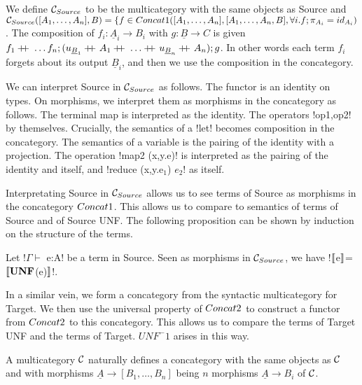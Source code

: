 \begin{definition}
    We define $\mathcal{C}_{Source}$ to be the multicategory with the same objects as Source and 
    $\mathcal{C}_{Source}([A_1,\ldots,A_n],B)=\{f\in Concat1([A_1,\ldots,A_n],[A_1,\ldots,A_n,B], \forall i.f;\pi_{A_i}=id_{A_i})$.
    The composition of $f_i:\underline{A}_i\to B_i$ with $g:\underline{B}\to C$ is given 
    $f_1\concatcomp\ldots f_n;(u_{\underline{B}_1}\concatcomp A_1 \concatcomp \ldots \concatcomp u_{\underline{B}_n}\concatcomp A_n);g$.
    In other words each term $f_i$ forgets about its output $\underline{B}_i$, and then we use the composition in the concategory.
\end{definition}

We can interpret Source in $\mathcal{C}_{Source}$ as follows. The functor is an identity on types. 
On morphisms, we interpret them as morphisms in the concategory as follows.
The terminal map is interpreted as the identity. The operators !op1,op2! by themselves.
Crucially, the semantics of a !let! becomes composition in the concategory. 
The semantics of a variable is the pairing of the identity with a projection.
The operation !map2 (x,y.e)! is interpreted as the pairing of the identity and itself, and !reduce (x,y.e$_1$) $e_2$! as itself.

Interpretating Source in $\mathcal{C}_{Source}$ allows us to see terms of Source as morphisms in the concategory $Concat1$.
This allows us to compare to semantics of terms of Source and of Source UNF.
The following proposition can be shown by induction on the structure of the terms.

\begin{proposition}
    Let !$\Gamma \vdash$ e:A! be a term in Source. 
    Seen as morphisms in $\mathcal{C}_{Source}$, we have !$\llbracket$e$\rrbracket$=$\llbracket\mathbf{UNF}$(e)$\rrbracket$!.
\end{proposition}

In a similar vein, we form a concategory from the syntactic multicategory for Target.
We then use the universal property of $Concat2$ to construct a functor from $Concat2$ to this concategory.
This allows us to compare the terms of Target UNF and the terms of Target. 
$UNF^-1$ arises in this way.

\begin{definition}
    A multicategory $\mathcal{C}$ naturally defines a concategory with the same objects as $\mathcal{C}$ and
    with morphisms $\underline{A}\to [B_1,\ldots,B_n]$ being $n$ morphisms $\underline{A}\to B_i$ of $\mathcal{C}$. 
\end{definition}

